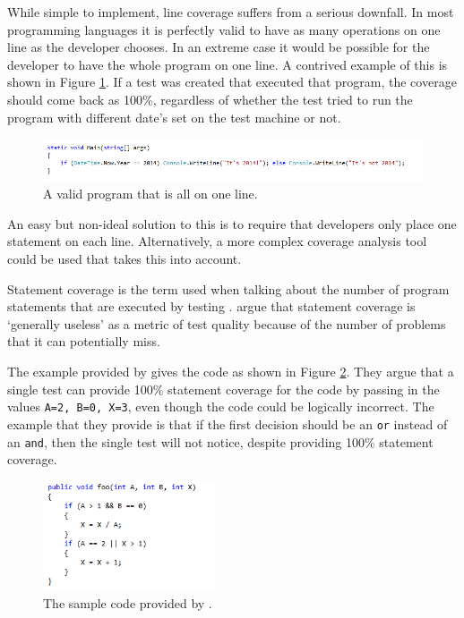 While simple to implement, line coverage suffers from a serious downfall. In most programming languages it is perfectly valid to have as many operations on one line as the developer chooses. In an extreme case it would be possible for the developer to have the whole program on one line. A contrived example of this is shown in Figure \ref{lineCoverage}. If a test was created that executed that program, the coverage should come back as 100\%, regardless of whether the test tried to run the program with different date's set on the test machine or not.

\begin{figure}
	\begin{center}
		\includegraphics[width=6in]{figures/line_coverage.png}
	\end{center}
\caption{A valid program that is all on one line.}
\label{lineCoverage}
\end{figure}

An easy but non-ideal solution to this is to require that developers only place one statement on each line. Alternatively, a more complex coverage analysis tool could be used that takes this into account.

Statement coverage is the term used when talking about the number of program statements that are executed by testing \citep{Myers:2004:AST:983238}. \citet{Myers:2004:AST:983238} argue that statement coverage is `generally useless' as a metric of test quality because of the number of problems that it can potentially miss.

The example provided by \citet{Myers:2004:AST:983238} gives the code as shown in Figure \ref{codeCoverage}. They argue that a single test can provide 100\% statement coverage for the code by passing in the values \verb+A=2, B=0, X=3+, even though the code could be logically incorrect. The example that they provide is that if the first decision should be an \verb+or+ instead of an \verb+and+, then the single test will not notice, despite providing 100\% statement coverage.

\begin{figure}[h]
	\begin{center}
		\includegraphics[width=2in]{figures/code_coverage.png}
	\end{center}
\caption{The sample code provided by \citet{Myers:2004:AST:983238}.}
\label{codeCoverage}
\end{figure}

